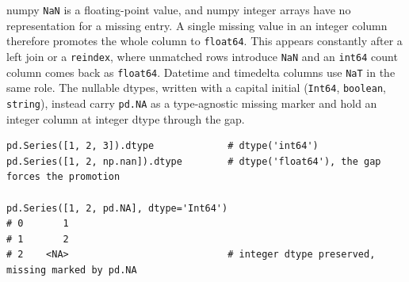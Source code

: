 \vspace{2ex}

\begin{keybox}
numpy \texttt{NaN} is a floating-point value, and numpy integer arrays have no representation for a missing entry. A single missing value in an integer column therefore promotes the whole column to \texttt{float64}. This appears constantly after a left join or a \texttt{reindex}, where unmatched rows introduce \texttt{NaN} and an \texttt{int64} count column comes back as \texttt{float64}. Datetime and timedelta columns use \texttt{NaT} in the same role. The nullable dtypes, written with a capital initial (\texttt{Int64}, \texttt{boolean}, \texttt{string}), instead carry \texttt{pd.NA} as a type-agnostic missing marker and hold an integer column at integer dtype through the gap.
\end{keybox}

\vspace{2ex}

\begin{lstlisting}[style=python, caption={A NaN forces float64, a nullable dtype keeps the integer}]
pd.Series([1, 2, 3]).dtype             # dtype('int64')
pd.Series([1, 2, np.nan]).dtype        # dtype('float64'), the gap forces the promotion

pd.Series([1, 2, pd.NA], dtype='Int64')
# 0       1
# 1       2
# 2    <NA>                            # integer dtype preserved, missing marked by pd.NA
\end{lstlisting}
